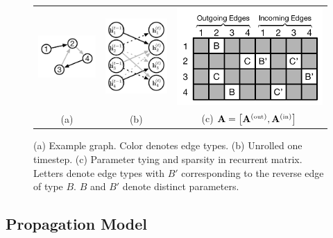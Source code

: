 \documentclass{article} %
\begin{document}
\begin{figure}[t]
\begin{center}
\begin{tabular}{ccc}
\includegraphics[width=.25 \columnwidth]{figs/example-graph.pdf} &
\includegraphics[width=.18 \columnwidth]{figs/unrolled-graph3.pdf} &
\includegraphics[width=.32 \columnwidth]{figs/recurrent-matrix-sparsity-pattern2.pdf}
\\
(a) & (b) & (c) $\Av = \left[ \Av^{(\hbox{\tiny{out}})},  \Av^{(\hbox{\tiny{in}})} \right]$
\end{tabular}
\end{center}
\vspace{-10pt}
\caption{
  (a) Example graph. Color denotes edge types.
  (b) Unrolled one timestep.
  (c) Parameter tying and sparsity in recurrent matrix. Letters denote
  edge types with $B'$ corresponding to the reverse edge of type $B$.
  $B$ and $B'$ denote distinct parameters.
}
\label{fig:graphs-and-sparsity}
\end{figure}


\subsection{Propagation Model}
\end{document}
